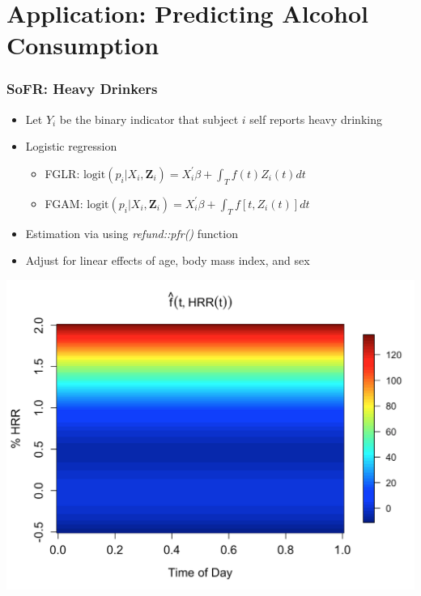 \documentclass[10pt]{beamer}\usepackage[]{graphicx}\usepackage[]{color}
\begin{document}
\section{Application: Predicting Alcohol Consumption}

\begin{frame}
\frametitle{SoFR: Heavy Drinkers}
\begin{itemize}
\item Let $Y_i$ be the binary indicator that subject $i$ self reports heavy drinking
\item Logistic regression
    \begin{itemize}
    \item FGLR: $\text{logit}(p_i|X_i,\mathbf{Z}_i) = X_i^\prime \beta + \int_T f(t)Z_i(t)dt $
    \item FGAM: $\text{logit}(p_i|X_i,\mathbf{Z}_i) = X_i^\prime\beta + \int_T f[t,Z_i(t)]dt$
    \end{itemize}
\item Estimation via using {\it refund::pfr()} function
\item Adjust for linear effects of age, body mass index, and sex
\end{itemize}
\end{frame}




\begin{frame}
\includegraphics[height=\textheight]{fgam_hrr}
\end{frame}
\end{document}
